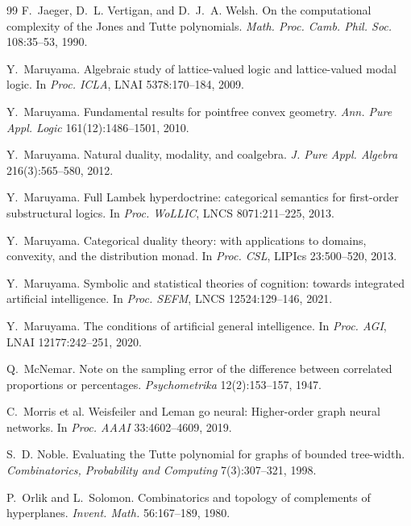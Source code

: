 \documentclass[runningheads]{llncs}
\begin{document}
\begin{thebibliography}{99}
F.~Jaeger, D.~L. Vertigan, and D.~J.~A. Welsh.
\newblock On the computational complexity of the Jones and Tutte polynomials.
\newblock \emph{Math. Proc. Camb. Phil. Soc.} 108:35--53, 1990.

Y.~Maruyama.
\newblock Algebraic study of lattice-valued logic and lattice-valued modal logic.
\newblock In \emph{Proc. ICLA}, LNAI 5378:170--184, 2009.

Y.~Maruyama.
\newblock Fundamental results for pointfree convex geometry.
\newblock \emph{Ann. Pure Appl. Logic} 161(12):1486--1501, 2010.

Y.~Maruyama.
\newblock Natural duality, modality, and coalgebra.
\newblock \emph{J. Pure Appl. Algebra} 216(3):565--580, 2012.

Y.~Maruyama.
\newblock Full Lambek hyperdoctrine: categorical semantics for first-order substructural logics.
\newblock In \emph{Proc. WoLLIC}, LNCS 8071:211--225, 2013.

Y.~Maruyama.
\newblock Categorical duality theory: with applications to domains, convexity, and the distribution monad.
\newblock In \emph{Proc. CSL}, LIPIcs 23:500--520, 2013.

Y.~Maruyama.
\newblock Symbolic and statistical theories of cognition: towards integrated artificial intelligence.
\newblock In \emph{Proc. SEFM}, LNCS 12524:129--146, 2021.

Y.~Maruyama.
\newblock The conditions of artificial general intelligence.
\newblock In \emph{Proc. AGI}, LNAI 12177:242--251, 2020.

Q.~McNemar.
\newblock Note on the sampling error of the difference between correlated proportions or percentages.
\newblock \emph{Psychometrika} 12(2):153--157, 1947.

C.~Morris et al.
\newblock Weisfeiler and Leman go neural: Higher-order graph neural networks.
\newblock In \emph{Proc. AAAI} 33:4602--4609, 2019.

S.~D. Noble.
\newblock Evaluating the Tutte polynomial for graphs of bounded tree-width.
\newblock \emph{Combinatorics, Probability and Computing} 7(3):307--321, 1998.

P.~Orlik and L.~Solomon.
\newblock Combinatorics and topology of complements of hyperplanes.
\newblock \emph{Invent. Math.} 56:167--189, 1980.


\end{thebibliography}
\end{document}
